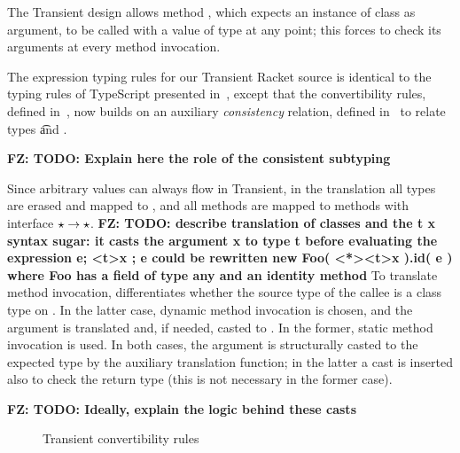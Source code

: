 \documentclass[acmlarge, anonymous, authordraft, review]{acmart} %
\newcommand{\FZ}[1]{\textbf{FZ: #1}}
\begin{document}
\noindent 
The Transient design allows method \m, which expects an instance of
class \C as argument, to be called with a value of type \any at any point; this forces
\m to check its arguments at every method invocation.   

The expression typing rules for our Transient Racket source is identical to the typing rules of TypeScript presented in~, except that the convertibility rules, defined in~, now builds on an auxiliary \emph{consistency}  relation, defined in~ to relate types \t and \tp.
 
\FZ{TODO: Explain here the role of the consistent subtyping}

Since arbitrary values can always flow in Transient, in the \kafka translation all types are erased and mapped to \any, and all methods are mapped to methods with interface \(\any \to \any\).   \FZ{TODO: describe translation of classes and the t x syntax sugar: it casts the argument x to type t before evaluating the expression e; <t>x ;  e  could be rewritten  new Foo( <*><t>x ).id( e )  where Foo has a field of type any and an identity method } To translate method invocation, \kafka differentiates whether the source type of the callee is a class type \C on \any.  In the latter case, dynamic method invocation is chosen, and the argument is translated and, if needed, casted to \any.  In the former, static method invocation is used.  In both cases, the argument is structurally casted to the expected type by the auxiliary translation function; in the latter a cast is inserted also to check the return type (this is not necessary in the former case).

\FZ{TODO: Ideally, explain the logic behind these casts}



\begin{figure}
\hrulefill
\begin{mathpar}




\end{mathpar}
\hrulefill
\caption{Transient convertibility rules}\label{f:transientts}
\end{figure}
\end{document}
